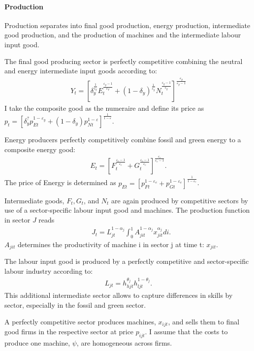 \paragraph{Production}
Production separates into final good production, energy production, intermediate good production, and the production of machines and the intermediate labour input good. 

The final good producing sector is perfectly competitive combining the neutral and energy intermediate input goods according to:
\begin{align}
Y_t=\left[\delta_y^\frac{1}{\varepsilon_y}E_{t}^{\frac{\varepsilon_y-1}{\varepsilon_Y}}+(1-\delta_y)^\frac{1}{\varepsilon_y}N_{t}^{\frac{\varepsilon_y-1}{\varepsilon_y}}\right]^\frac{\varepsilon_y}{\varepsilon_y-1}
\end{align} 
I take the composite good as the numeraire and define its price as $p_t=\left[\delta_y^?p_{Et}^{1-\varepsilon_y}+(1-\delta_y)p_{Nt}^{1-\varepsilon}\right]^{\frac{1}{1-\varepsilon}}$.

Energy producers perfectly competitively combine fossil and green energy to a composite energy good:
\begin{align}
E_t=\left[F_t^\frac{\varepsilon_e-1}{\varepsilon_e}+G_t^\frac{\varepsilon_e-1}{\varepsilon_e}\right]^\frac{\varepsilon_e}{\varepsilon_e-1}.
\end{align}
The price of Energy is determined as  $p_{Et}= \left[p_{Ft}^{1-\varepsilon_e}+p_{Gt}^{1-\varepsilon_e}\right]^\frac{1}{{1-\varepsilon_e}}$.

Intermediate goods, $F_t, G_t$, and $N_t$ are again produced by competitive sectors by use of a sector-specific labour input good and machines. The production function in sector $J$ reads
\begin{align}
&J_{t}= L_{jt}^{1-\alpha_j}\int_{0}^{1}A_{jit}^{1-\alpha_j}x_{jit}^{\alpha_j} di.
\end{align}
$A_{jit}$ determines the productivity of machine i in sector j at time t: $x_{jit}$.

The labour input good is produced by a perfectly competitive and sector-specific labour industry according to: 
\begin{align}
L_{jt}=h_{hjt}^{\theta_j}h_{ljt}^{1-\theta_j}.
\end{align}
This additional intermediate sector allows to capture differences in skills by sector, especially in the fossil and green sector.

A perfectly competitive sector produces machines, $x_{ijt}$, and sells them to final good firms in the respective sector at price $p_{ijt}$. I assume that the costs to produce one machine, $\psi$, are homogeneous across firms. %


